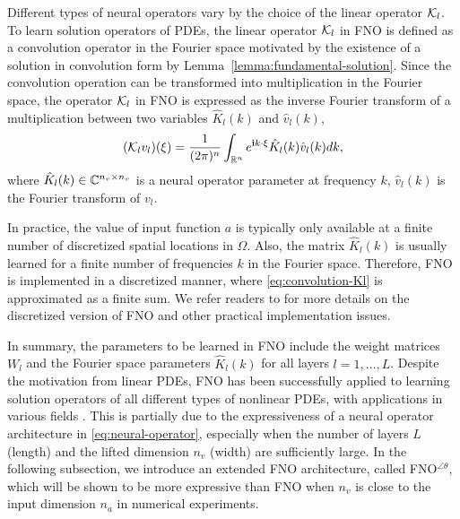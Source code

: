 \documentclass[letterpaper, 10 pt, conference]{ieeeconf}  %
\begin{document}
Different types of neural operators vary by the choice of the linear operator $\mathcal K_l$. 
To learn solution operators of PDEs, the linear operator $\mathcal K_l$ in FNO is defined as a convolution operator in the Fourier space motivated by the existence of a solution in convolution form by Lemma~\ref{lemma:fundamental-solution}.
Since the convolution operation can be transformed into multiplication in the Fourier space, the operator $\mathcal K_l$ in FNO is expressed as the inverse Fourier transform of a multiplication between two variables $\hat{K}_l(k)$ and $\hat{v}_l(k)$,
\begin{equation}\label{eq:convolution-Kl}
(\mathcal K_lv_l)(\xi) = \frac{1}{(2\pi)^n}\int_{\mathbb{R}^n} e^{\mathbf{i} k \cdot \xi} \hat{K}_l(k) \hat{v}_l(k)dk,
\end{equation}
where $\hat{K}_l(k)\in \mathbb{C}^{n_v \times n_v}$ is a neural operator parameter at frequency $k$, $\hat{v}_l(k)$ is the Fourier transform of $v_l$.
\begin{remark}
   In practice, the value of input function $a$ is typically only available at a finite number of discretized spatial locations in $\Omega$.
   Also, the matrix $\hat{K}_l(k)$ is usually learned for a finite number of frequencies $k$ in the Fourier space.
Therefore, FNO is implemented in a discretized manner, where \eqref{eq:convolution-Kl} is approximated as a finite sum. 
We refer readers to \cite{li2020fourier,duruisseaux2025fourier} for more details on the discretized version of FNO and other practical implementation issues.
\end{remark}

In summary, the parameters to be learned in FNO include the weight matrices $W_l$ and the Fourier space parameters $\hat{K}_l(k)$ for all layers $l=1,\ldots,L$. 
Despite the motivation from linear PDEs, FNO has been successfully applied to learning solution operators of all different types of nonlinear PDEs, with applications in various fields \cite{li2020fourier,duruisseaux2025fourier}.
This is partially due to the expressiveness of a neural operator architecture in \eqref{eq:neural-operator}, especially when the number of layers $L$ (length) and the lifted dimension $n_v$ (width) are sufficiently large.
In the following subsection, we introduce an extended FNO architecture, called FNO$^{\angle \theta}$, which will be shown to be more expressive than FNO when $n_v$ is close to the input dimension $n_a$ in numerical experiments.
\end{document}
